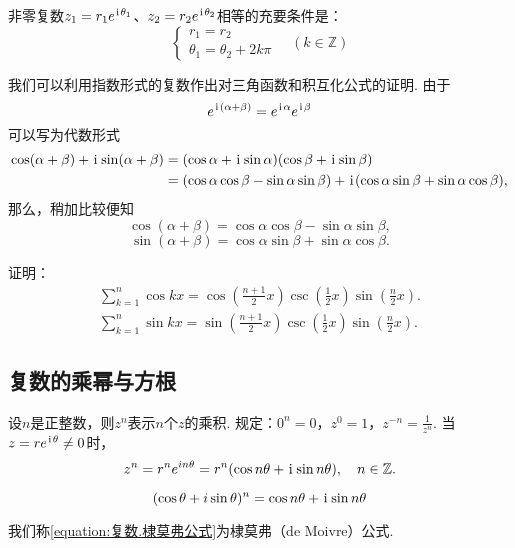 \begin{theorem}[指数形式下复数相等条件]
非零复数\(z_1=r_1 e^{\kern1pt\mathrm{i}\kern1pt\theta_1}\)、\(z_2=r_2 e^{\kern1pt\mathrm{i}\kern1pt\theta_2}\)相等的充要条件是：\[
\left\{ \begin{array}{l}
r_1 = r_2 \\
\theta_1 = \theta_2 + 2k\pi
\end{array} \right. \quad (k \in \mathbb{Z})
\]
\end{theorem}

我们可以利用指数形式的复数作出对三角函数和积互化公式的证明.
由于\[
e^{\kern1pt\mathrm{i}\kern1pt(\alpha+\beta)}
= e^{\kern1pt\mathrm{i}\kern1pt\alpha} e^{\kern1pt\mathrm{i}\kern1pt\beta}
\]
可以写为代数形式
\[\begin{aligned}
\cos(\alpha+\beta)+\kern1pt\mathrm{i}\kern1pt\sin(\alpha+\beta)
&= (\cos\alpha+\kern1pt\mathrm{i}\kern1pt\sin\alpha)(\cos\beta+\kern1pt\mathrm{i}\kern1pt\sin\beta) \\
&= (\cos\alpha \cos\beta - \sin\alpha \sin\beta)
    + \kern1pt\mathrm{i}\kern1pt(\cos\alpha \sin\beta + \sin\alpha \cos\beta),
\end{aligned}\]
那么，稍加比较便知\[
\cos(\alpha+\beta) = \cos\alpha \cos\beta - \sin\alpha \sin\beta,
\]\[
\sin(\alpha+\beta) = \cos\alpha \sin\beta + \sin\alpha \cos\beta.
\]

\begin{example}
证明：\begin{gather}
\sum\limits_{k=1}^n \cos kx
    = \cos(\frac{n+1}{2}x)
    \csc(\frac{1}{2}x)
    \sin(\frac{n}{2}x). \\
\sum\limits_{k=1}^n \sin kx
    = \sin(\frac{n+1}{2}x)
    \csc(\frac{1}{2}x)
    \sin(\frac{n}{2}x).
\end{gather}
\end{example}

\subsection{复数的乘幂与方根}
\begin{definition}
设\(n\)是正整数，则\(z^n\)表示\(n\)个\(z\)的乘积.
规定：\(0^n=0\)，\(z^0=1\)，\(z^{-n}=\frac{1}{z^n}\).
当\(z=re^{\kern1pt\mathrm{i}\kern1pt\theta} \neq 0\)时，\[
z^n = r^n e^{in\theta} = r^n(\cos n\theta+\kern1pt\mathrm{i}\kern1pt\sin n\theta),
\quad n \in \mathbb{Z}.
\]
\end{definition}

\begin{theorem}[棣莫弗公式]
\begin{equation}\label{equation:复数.棣莫弗公式}
(\cos\theta+i\sin\theta)^n = \cos{n\theta}+\kern1pt\mathrm{i}\kern1pt\sin{n\theta}
\end{equation}
\end{theorem}
我们称\cref{equation:复数.棣莫弗公式}为{棣莫弗（de Moivre）公式}.


